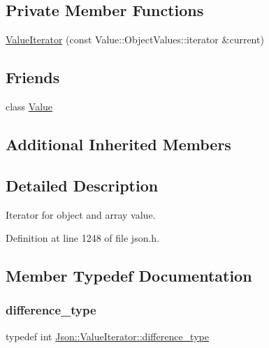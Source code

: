 \subsection*{Private Member Functions}
\begin{DoxyCompactItemize}
\item 
\hyperlink{class_json_1_1_value_iterator_afb06ea21add440c78c27dc49570460a5}{Value\+Iterator} (const Value\+::\+Object\+Values\+::iterator \&current)
\end{DoxyCompactItemize}
\subsection*{Friends}
\begin{DoxyCompactItemize}
\item 
class \hyperlink{class_json_1_1_value_iterator_aeceedf6e1a7d48a588516ce2b1983d6f}{Value}
\end{DoxyCompactItemize}
\subsection*{Additional Inherited Members}


\subsection{Detailed Description}
Iterator for object and array value. 

Definition at line 1248 of file json.\+h.



\subsection{Member Typedef Documentation}
\mbox{\label{class_json_1_1_value_iterator_a2be1a9aa60bbfc8812e9dd1a7f1a8786}} 
\subsubsection{\texorpdfstring{difference\+\_\+type}{difference\_type}}
{\footnotesize\ttfamily typedef int \hyperlink{class_json_1_1_value_iterator_a2be1a9aa60bbfc8812e9dd1a7f1a8786}{Json\+::\+Value\+Iterator\+::difference\+\_\+type}}



